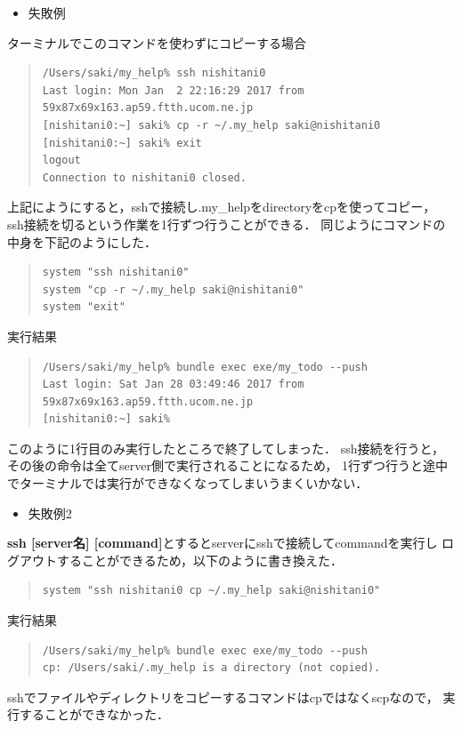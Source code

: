 \begin{itemize}
\item 失敗例
\end{itemize}
ターミナルでこのコマンドを使わずにコピーする場合
\begin{quote}\begin{verbatim}
/Users/saki/my_help% ssh nishitani0
Last login: Mon Jan  2 22:16:29 2017 from 59x87x69x163.ap59.ftth.ucom.ne.jp
[nishitani0:~] saki% cp -r ~/.my_help saki@nishitani0
[nishitani0:~] saki% exit
logout
Connection to nishitani0 closed.
\end{verbatim}\end{quote}
上記にようにすると，sshで接続し.my\_helpをdirectoryをcpを使ってコピー，
ssh接続を切るという作業を1行ずつ行うことができる．
同じようにコマンドの中身を下記のようにした．
\begin{quote}\begin{verbatim}
system "ssh nishitani0"
system "cp -r ~/.my_help saki@nishitani0"
system "exit"
\end{verbatim}\end{quote}
実行結果
\begin{quote}\begin{verbatim}
/Users/saki/my_help% bundle exec exe/my_todo --push
Last login: Sat Jan 28 03:49:46 2017 from 59x87x69x163.ap59.ftth.ucom.ne.jp
[nishitani0:~] saki% 
\end{verbatim}\end{quote}
このように1行目のみ実行したところで終了してしまった．
ssh接続を行うと，その後の命令は全てserver側で実行されることになるため，
1行ずつ行うと途中でターミナルでは実行ができなくなってしまいうまくいかない．

\begin{itemize}
\item 失敗例2
\end{itemize}
\textbf{ssh [server名] [command]}とするとserverにsshで接続してcommandを実行し
ログアウトすることができるため，以下のように書き換えた．
\begin{quote}\begin{verbatim}
system "ssh nishitani0 cp ~/.my_help saki@nishitani0"
\end{verbatim}\end{quote}
実行結果
\begin{quote}\begin{verbatim}
/Users/saki/my_help% bundle exec exe/my_todo --push
cp: /Users/saki/.my_help is a directory (not copied).
\end{verbatim}\end{quote}
sshでファイルやディレクトリをコピーするコマンドはcpではなくscpなので，
実行することができなかった．

